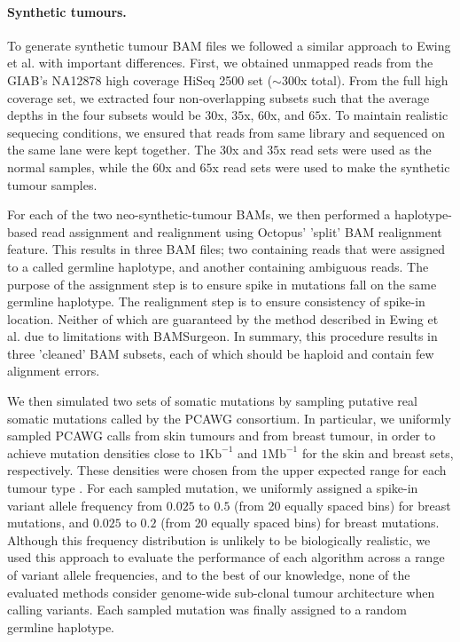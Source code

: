 \documentclass[notitlepage, twocolumn, 10pt]{article}
\begin{document}
\paragraph*{Synthetic tumours.} To generate synthetic tumour BAM files we followed a similar approach to Ewing et al. \cite{RN147} with important differences. First, we obtained unmapped reads from the GIAB's NA12878 high coverage HiSeq 2500 set ($\sim 300$x total). From the full high coverage set, we extracted four non-overlapping subsets such that the average depths in the four subsets would be $30$x, $35$x, $60$x, and $65$x. To maintain realistic sequecing conditions, we ensured that reads from same library and sequenced on the same lane were kept together. The $30$x and $35$x read sets were used as the normal samples, while the $60$x and $65$x read sets were used to make the synthetic tumour samples.

For each of the two neo-synthetic-tumour BAMs, we then performed a haplotype-based read assignment and realignment using Octopus' 'split' BAM realignment feature. This results in three BAM files; two containing reads that were assigned to a called germline haplotype, and another containing ambiguous reads. The purpose of the assignment step is to ensure spike in mutations fall on the same germline haplotype. The realignment step is to ensure consistency of spike-in location. Neither of which are guaranteed by the method described in Ewing et al. due to limitations with BAMSurgeon. In summary, this procedure results in three 'cleaned' BAM subsets, each of which should be haploid and contain few alignment errors.

We then simulated two sets of somatic mutations by sampling putative real somatic mutations called by the PCAWG consortium. In particular, we uniformly sampled PCAWG calls from skin tumours and from breast tumour, in order to achieve mutation densities close to $1\text{Kb}^{-1}$ and $1\text{Mb}^{-1}$ for the skin and breast sets, respectively. These densities were chosen from the upper expected range for each tumour type \cite{RN86}. For each sampled mutation, we uniformly assigned a spike-in variant allele frequency from $0.025$ to $0.5$ (from 20 equally spaced bins) for breast mutations, and $0.025$ to $0.2$ (from 20 equally spaced bins) for breast mutations. Although this frequency distribution is unlikely to be biologically realistic, we used this approach to evaluate the performance of each algorithm across a range of variant allele frequencies, and to the best of our knowledge, none of the evaluated methods consider genome-wide sub-clonal tumour architecture when calling variants. Each sampled mutation was finally assigned to a random germline haplotype.
\end{document}
